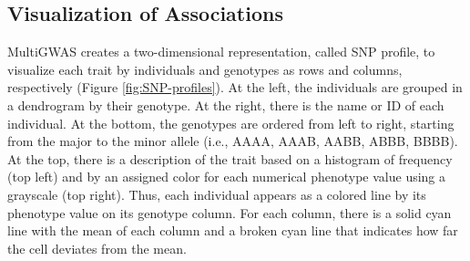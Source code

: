 \documentclass{article}
\begin{document}
\subsection{Visualization of Associations }
MultiGWAS creates a two-dimensional representation, called SNP profile, to visualize each trait by individuals and genotypes as rows and columns, respectively (Figure \ref{fig:SNP-profiles}). At the left, the individuals are grouped in a dendrogram by their genotype. At the right, there is the name or ID of each individual. At the bottom, the genotypes are ordered from left to right, starting from the major to the minor allele (i.e., AAAA, AAAB, AABB, ABBB, BBBB). At the top, there is a description of the trait based on a histogram of frequency (top left) and by an assigned color for each numerical phenotype value using a grayscale (top right). Thus, each individual appears as a colored line by its phenotype value on its genotype column. For each column, there is a solid cyan line with the mean of each column and a broken cyan line that indicates how far the cell deviates from the mean.
\end{document}
